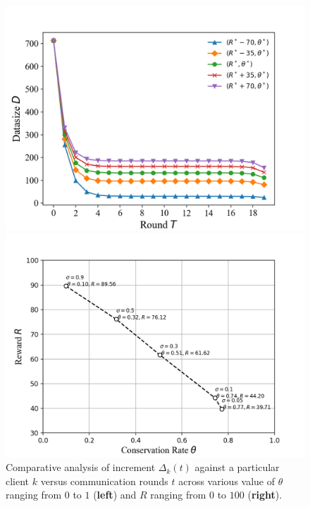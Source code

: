 \documentclass{article}
\theoremstyle{plain}
\theoremstyle{definition}
\theoremstyle{remark}
\begin{document}
\begin{figure}
	\begin{minipage}{0.49\linewidth}
		\centerline{\includegraphics[width=\textwidth]{figures/figure_55_B.png}}
	\end{minipage}
	\begin{minipage}{0.49\linewidth}
		\centerline{\includegraphics[width=\textwidth]{figures/figure_80.png}}
	\end{minipage}
	\caption{Comparative analysis of increment $\Delta_k(t)$ against a particular client $k$ versus communication rounds $t$ across various value of $\theta$ ranging from $0$ to $1$ (\textbf{left}) and $R$ ranging from $0$ to $100$ (\textbf{right}).}
  \label{fig:hyperparam}
\end{figure}
\end{document}
